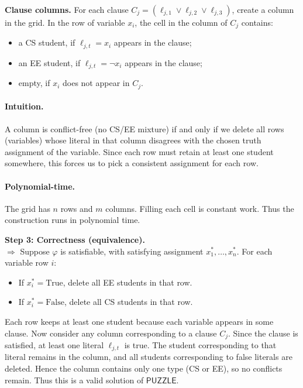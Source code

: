 \textbf{Clause columns.}
For each clause \(C_j = (\ell_{j,1} \lor \ell_{j,2} \lor \ell_{j,3})\),
create a column in the grid.
In the row of variable \(x_i\), the cell in the column of \(C_j\) contains:
\begin{itemize}
    \item a CS student, if \(\ell_{j,t} = x_i\) appears in the clause;
    \item an EE student, if \(\ell_{j,t} = \neg x_i\) appears in the clause;
    \item empty, if \(x_i\) does not appear in \(C_j\).
\end{itemize}

\paragraph{Intuition.}
A column is conflict-free (no CS/EE mixture) if and only if
we delete all rows (variables) whose literal in that column
disagrees with the chosen truth assignment of the variable.
Since each row must retain at least one student somewhere,
this forces us to pick a consistent assignment for each row.

\paragraph{Polynomial-time.}
The grid has \(n\) rows and \(m\) columns. Filling each cell is constant work.
Thus the construction runs in polynomial time.


\noindent\textbf{Step 3: Correctness (equivalence).} \\

\noindent
\(\Rightarrow\)
Suppose \(\varphi\) is satisfiable, with satisfying assignment \(x_1^*,\dots,x_n^*\).
For each variable row \(i\):
\begin{itemize}
    \item If \(x_i^* = \mathrm{True}\), delete all EE students in that row.
    \item If \(x_i^* = \mathrm{False}\), delete all CS students in that row.
\end{itemize}
Each row keeps at least one student because each variable appears in some clause.
Now consider any column corresponding to a clause \(C_j\).
Since the clause is satisfied, at least one literal \(\ell_{j,t}\) is true.
The student corresponding to that literal remains in the column,
and all students corresponding to false literals are deleted.
Hence the column contains only one type (CS or EE), so no conflicts remain.
Thus this is a valid solution of \(\mathsf{PUZZLE}\).

